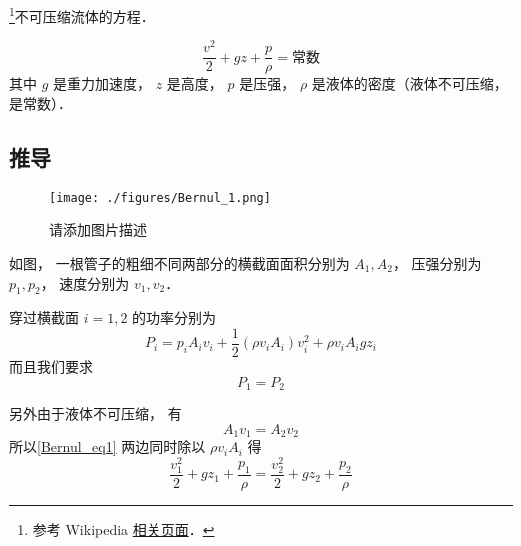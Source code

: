 
\begin{issues}
\issueDraft
\end{issues}

\footnote{参考 Wikipedia \href{https://en.wikipedia.org/wiki/Bernoulli-principle}{相关页面}．}不可压缩流体的方程．

\begin{equation}
\frac{v^2}{2} + gz + \frac{p}{\rho} = \text{常数}
\end{equation}
其中 $g$ 是重力加速度， $z$ 是高度， $p$ 是压强， $\rho$ 是液体的密度（液体不可压缩， 是常数）．

\subsection{推导}
\begin{figure}[ht]
\centering
\texttt{[image: ./figures/Bernul\_1.png]}
\caption{请添加图片描述} \label{Bernul_fig1}
\end{figure}
如图， 一根管子的粗细不同两部分的横截面面积分别为 $A_1, A_2$， 压强分别为 $p_1, p_2$， 速度分别为 $v_1, v_2$．

穿过横截面 $i = 1, 2$ 的功率分别为
\begin{equation}
P_i = p_i A_i v_i + \frac{1}{2} (\rho v_i A_i) v_i^2 + \rho v_i A_i g z_i
\end{equation}
而且我们要求
\begin{equation}\label{Bernul_eq1}
P_1 = P_2
\end{equation}

另外由于液体不可压缩， 有
\begin{equation}
A_1v_1 = A_2 v_2
\end{equation}
所以\autoref{Bernul_eq1} 两边同时除以 $\rho v_i A_i$ 得
\begin{equation}
\frac{v_1^2}{2} + gz_1 + \frac{p_1}{\rho} = \frac{v_2^2}{2} + gz_2 + \frac{p_2}{\rho}
\end{equation}

